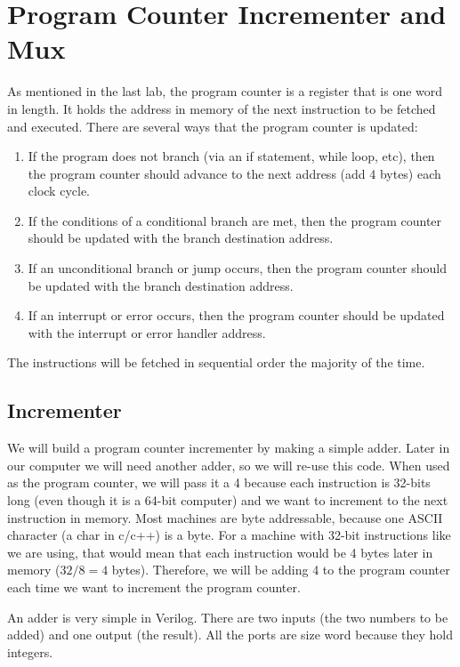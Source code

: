 \chapter{Program Counter Incrementer and Mux}

As mentioned in the last lab, the program counter is a register that is one word in length.  It holds the address in memory of the next instruction to be fetched and executed.  There are several ways that the program counter is updated:  
\begin{enumerate}
	\item If the program does not branch (via an if statement, while loop, etc), then the program counter should advance to the next address (add 4 bytes) each clock cycle.
	\item If the conditions of a conditional branch are met, then the program counter should be updated with the branch destination address.
	\item If an unconditional branch or jump occurs, then the program counter should be updated with the branch destination address.
	\item If an interrupt or error occurs, then the program counter should be updated with the interrupt or error handler address.
\end{enumerate}
The instructions will be fetched in sequential order the majority of the time.

\section{Incrementer}

We will build a program counter incrementer by making a simple adder.  Later in our computer we will need another adder, so we will re-use this code.  When used as the program counter, we will pass it a 4 because each instruction is 32-bits long (even though it is a 64-bit computer) and we want to increment to the next instruction in memory.  Most machines are byte addressable, because one ASCII character (a char in c/c++) is a byte.  For a machine with 32-bit instructions like we are using, that would mean that each instruction would be 4 bytes later in memory ($32/8=4$ bytes).  Therefore, we will be adding 4 to the program counter each time we want to increment the program counter.

An adder is very simple in Verilog.  There are two inputs (the two numbers to be added) and one output (the result).   All the ports are size word because they hold integers.  

